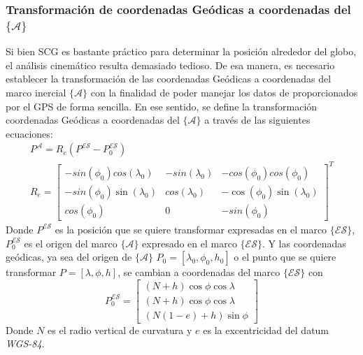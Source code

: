 \documentclass[10pt]{report}
\numberwithin{equation}{chapter}
\numberwithin{algorithm}{chapter}
\newcommand{\marco}[1]{\{\mathcal{#1}\}}
\begin{document}
\subsubsection{Transformación de coordenadas Geódicas a coordenadas del $\marco{A}$}
Si bien SCG es bastante práctico para determinar la posición alrededor del globo, el análisis cinemático resulta demasiado tedioso. De esa manera, es necesario establecer la transformación de las coordenadas Geódicas a coordenadas del marco inercial $\marco{A}$ con la finalidad de poder manejar los datos de proporcionados por el GPS de forma sencilla. En ese sentido, se define la transformación coordenadas Geódicas a coordenadas del $\marco{A}$ a través de las siguientes ecuaciones:
\begin{equation}\label{fundamentosGPS_ecc2}
\begin{array}{c}
P^\mathcal{A}=R_e(P^{\mathcal{ES}}-P_0^{\mathcal{ES}})\\
R_e=\begin{bmatrix}
-sin(\phi_{0})cos(\lambda_0)&-sin(\lambda_0)&-cos(\phi_{0})cos(\phi_{0})\\
-sin(\phi_{0})\sin(\lambda_0)&
cos(\lambda_0)&-\cos(\phi_{0})\sin(\lambda_0)\\
cos(\phi_{0})&0&-sin(\phi_{0})
\end{bmatrix}^T
\end{array}
\end{equation}
Donde $P^{\mathcal{ES}}$ es la posición que se quiere transformar expresadas en el marco $\marco{ES}$, $P_0^{\mathcal{ES}}$ es el origen del marco $\marco{A}$ expresado en el marco $\marco{ES}$. Y las coordenadas geódicas, ya sea del origen de $\marco{A}$ $P_0=[\lambda_0,\phi_0,h_0]$ o el punto que se quiere transformar $P=[\lambda,\phi,h]$, se cambian a coordenadas del marco $\marco{ES}$ con
\begin{equation}\label{fundamentosGPS_ecc3}
P_0^{\mathcal{ES}}=\begin{bmatrix}(N+h)\cos \phi \cos \lambda\\
(N+h)\cos \phi \cos \lambda\\
(N(1-e)+h)\sin \phi 
\end{bmatrix}
\end{equation}
Donde $N$ es el radio vertical de curvatura y $e$ es la excentricidad del datum \emph{WGS-84}.
\end{document}
